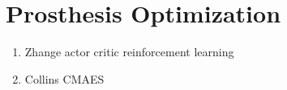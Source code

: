 \section{Prosthesis Optimization}\label{sec:back_optimization}
\begin{enumerate}
    \item Zhange actor critic reinforcement learning
    \item Collins CMAES
\end{enumerate}
